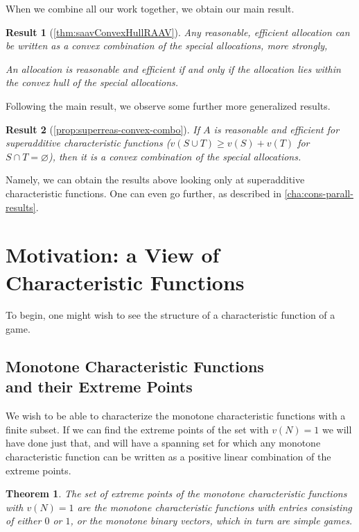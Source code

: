 \documentclass[12pt,letterpaper,final]{article}
\theoremstyle{plain}
\newtheorem{theorem}{Theorem}[section]
\theoremstyle{plain}
\theoremstyle{plain}
\theoremstyle{plain}
\theoremstyle{plain}
\theoremstyle{plain}
\theoremstyle{plain}
\newtheorem{result}{Result}
\theoremstyle{definition}
\theoremstyle{definition}
\theoremstyle{definition}
\theoremstyle{definition}
\theoremstyle{definition}
\theoremstyle{remark}
\theoremstyle{remark}
\theoremstyle{remark}
\theoremstyle{remark}
\begin{document}
When we combine all our work together, we obtain our main result.
\begin{result}[\cref{thm:saavConvexHullRAAV}]
  Any reasonable, efficient allocation can be written as a convex
  combination of the special allocations, more strongly, 
  \begin{center}
    An allocation is reasonable and efficient if and only if the
    allocation lies within the convex hull of the special allocations.
  \end{center}
\end{result}
Following the main result, we observe some further more generalized results.
\begin{result}[\cref{prop:superreas-convex-combo}]
  If \(A\) is reasonable and efficient for superadditive
  characteristic functions (\(v(S\cup T) \geq v(S) +v(T)\) for \(S\cap
  T=\varnothing\)), then it is a convex combination of the
  special allocations.
\end{result}
Namely, we can obtain the results above looking only at superadditive
characteristic functions. One can even go further, as described in
\cref{cha:cons-parall-results}.


 \section{Motivation: a View of Characteristic Functions}\label{cha:new-view-char}

To begin, one might wish to see the structure of a characteristic
function of a game.

\subsection{Monotone Characteristic Functions\\ and their Extreme Points}

We wish to be able to characterize the monotone characteristic
functions with a finite subset.
If we can find the extreme points of the set with \(v(N)=1\) we
will have done just that, and will have a spanning set for which any
monotone characteristic function can be written as a positive
linear combination of the extreme points. 

\begin{theorem}\label{thm:extremeptsmcf}
  The set of extreme points
  of the monotone characteristic functions
  with \(v(N)=1\) are the monotone  characteristic
  functions with entries consisting of either \(0\) or \(1\), or the
  monotone binary
  vectors, which in turn are simple games.
\end{theorem}
\end{document}
